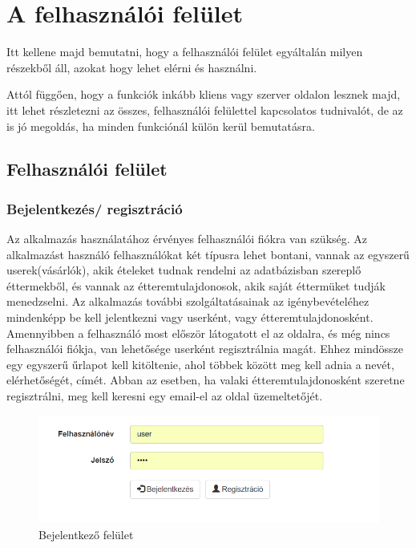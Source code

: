 \chapter{A felhasználói felület}

Itt kellene majd bemutatni, hogy a felhasználói felület egyáltalán milyen részekből áll, azokat hogy lehet elérni és használni.

Attól függően, hogy a funkciók inkább kliens vagy szerver oldalon lesznek majd, itt lehet részletezni az összes, felhasználói felülettel kapcsolatos tudnivalót, de az is jó megoldás, ha minden funkciónál külön kerül bemutatásra.

\section{Felhasználói felület}

\subsection{Bejelentkezés/ regisztráció}

Az alkalmazás használatához érvényes felhasználói fiókra van szükség. Az alkalmazást használó felhasználókat két típusra lehet bontani, vannak az egyszerű userek(vásárlók), akik ételeket tudnak rendelni az adatbázisban szereplő éttermekből, és vannak az étteremtulajdonosok, akik saját éttermüket tudják menedzselni. Az alkalmazás további szolgáltatásainak az igénybevételéhez mindenképp be kell jelentkezni vagy userként, vagy étteremtulajdonosként. Amennyibben a felhasználó most először látogatott el az oldalra, és még nincs felhasználói fiókja, van lehetősége userként regisztrálnia magát. Ehhez mindössze egy egyszerű űrlapot kell kitöltenie, ahol többek között meg kell adnia a nevét, elérhetőségét, címét. Abban az esetben, ha valaki étteremtulajdonosként szeretne regisztrálni, meg kell keresni egy email-el az oldal üzemeltetőjét.

\begin{figure}
\centering
\includegraphics[scale=0.8]{kepek/login.png}
\caption{Bejelentkező felület}
\label{fig:architecture}
\end{figure}

